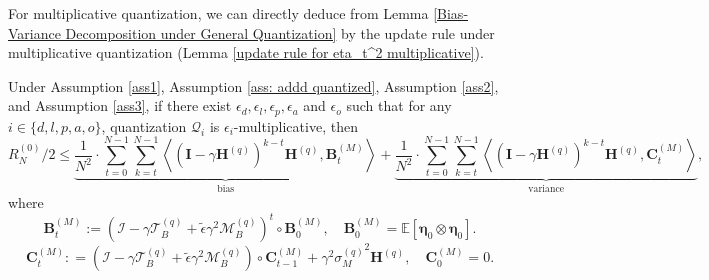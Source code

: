 \documentclass[11pt, letterpaper]{article}
\begin{document}
For multiplicative quantization, we can directly deduce from Lemma \ref{Bias-Variance Decomposition under General Quantization} by the update rule under multiplicative quantization (Lemma \ref{update rule for eta_t^2 multiplicative}).
\begin{lemma}
\label{Bias-Variance Decomposition under Multiplicative Quantization}
    Under Assumption \ref{ass1}, Assumption \ref{ass: addd quantized}, Assumption \ref{ass2}, and Assumption \ref{ass3}, if there exist $\epsilon_d,\epsilon_l,\epsilon_p,\epsilon_a$ and $\epsilon_o$ such that for any $i\in \{d,l,p,a,o\}$, quantization $\mathcal{Q}_i$ is $\epsilon_i$-multiplicative, then
    \begin{equation*}
        R_N^{(0)}/2\leq \underbrace{\frac{1}{N^2}\cdot\sum_{t=0}^{N-1}\sum_{k=t}^{N-1}\left\langle(\mathbf{I}-\gamma\mathbf{H}^{(q)})^{k-t}\mathbf{H}^{(q)},\mathbf{B}_t^{(M)}\right\rangle}_{\mathrm{bias}}+\underbrace{\frac{1}{N^2}\cdot\sum_{t=0}^{N-1}\sum_{k=t}^{N-1}\left\langle(\mathbf{I}-\gamma\mathbf{H}^{(q)})^{k-t}\mathbf{H}^{(q)},\mathbf{C}_t^{(M)}\right\rangle}_{\mathrm{variance}},
    \end{equation*}
    where
    \begin{equation*}
        \mathbf{B}_t^{(M)}:=(\mathcal{I}-\gamma\mathcal{T}_B^{(q)}+\tilde{\epsilon}\gamma^2\mathcal{M}_B^{(q)})^t \circ \mathbf{B}_0^{(M)}, \quad \mathbf{B}_0^{(M)}=\mathbb{E}\left[\boldsymbol{\eta}_0 \otimes \boldsymbol{\eta}_0\right].
    \end{equation*}
    \begin{equation*}
        \mathbf{C}_t^{(M)}: = (\mathcal{I}-\gamma \mathcal{T}_B^{(q)}+\tilde{\epsilon}\gamma^2\mathcal{M}_B^{(q)})\circ\mathbf{C}_{t-1}^{(M)}+\gamma^2 {\sigma_M^{(q)}}^2\mathbf{H}^{(q)}, \quad \mathbf{C}_0^{(M)}=0.
    \end{equation*}
\end{lemma}
\end{document}

